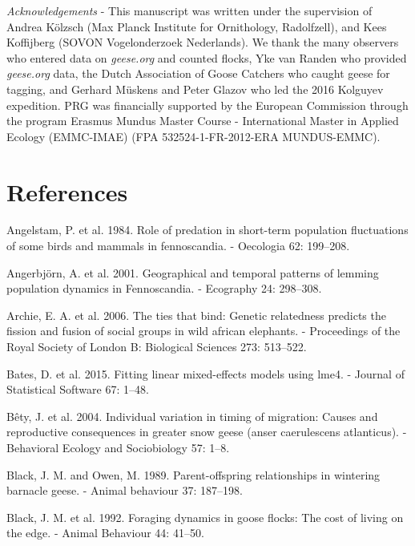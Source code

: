 \documentclass[10pt,twocolumn]{paper}
\begin{document}
\emph{Acknowledgements} - This manuscript was written under the
supervision of Andrea Kölzsch (Max Planck Institute for Ornithology,
Radolfzell), and Kees Koffijberg (SOVON Vogelonderzoek Nederlands). We
thank the many observers who entered data on \emph{geese.org} and
counted flocks, Yke van Randen who provided \emph{geese.org} data, the
Dutch Association of Goose Catchers who caught geese for tagging, and
Gerhard Müskens and Peter Glazov who led the 2016 Kolguyev expedition.
PRG was financially supported by the European Commission through the
program Erasmus Mundus Master Course - International Master in Applied
Ecology (EMMC-IMAE) (FPA 532524-1-FR-2012-ERA MUNDUS-EMMC).

\section*{References}\label{references}

\hypertarget{refs}{}
\hypertarget{ref-angelstam1984role}{}
Angelstam, P. et al. 1984. Role of predation in short-term population
fluctuations of some birds and mammals in fennoscandia. - Oecologia 62:
199--208.

\hypertarget{ref-angerbjorn2001geographical}{}
Angerbjörn, A. et al. 2001. Geographical and temporal patterns of
lemming population dynamics in Fennoscandia. - Ecography 24: 298--308.

\hypertarget{ref-Archie513}{}
Archie, E. A. et al. 2006. The ties that bind: Genetic relatedness
predicts the fission and fusion of social groups in wild african
elephants. - Proceedings of the Royal Society of London B: Biological
Sciences 273: 513--522.

\hypertarget{ref-lme4}{}
Bates, D. et al. 2015. Fitting linear mixed-effects models using lme4. -
Journal of Statistical Software 67: 1--48.

\hypertarget{ref-Buxeaty2004}{}
Bêty, J. et al. 2004. Individual variation in timing of migration:
Causes and reproductive consequences in greater snow geese (anser
caerulescens atlanticus). - Behavioral Ecology and Sociobiology 57:
1--8.

\hypertarget{ref-black1989parent}{}
Black, J. M. and Owen, M. 1989. Parent-offspring relationships in
wintering barnacle geese. - Animal behaviour 37: 187--198.

\hypertarget{ref-black1992foraging}{}
Black, J. M. et al. 1992. Foraging dynamics in goose flocks: The cost of
living on the edge. - Animal Behaviour 44: 41--50.
\end{document}
